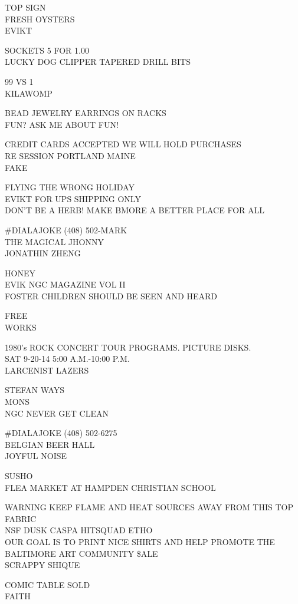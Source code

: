\documentclass[10pt,letterpaper]{article}
\begin{document}
TOP SIGN\\
FRESH OYSTERS\\
EVIKT

SOCKETS 5 FOR 1.00\\
LUCKY DOG CLIPPER TAPERED DRILL BITS

99 VS 1\\
KILAWOMP

BEAD JEWELRY EARRINGS ON RACKS\\
FUN?  ASK ME ABOUT FUN!

CREDIT CARDS ACCEPTED WE WILL HOLD PURCHASES\\
RE SESSION PORTLAND MAINE\\
FAKE

FLYING THE WRONG HOLIDAY\\
EVIKT FOR UPS SHIPPING ONLY\\
DON'T BE A HERB!  MAKE BMORE A BETTER PLACE FOR ALL

\#DIALAJOKE (408) 502{-}MARK\\
THE MAGICAL JHONNY\\
JONATHIN ZHENG

HONEY\\
EVIK NGC MAGAZINE VOL II\\
FOSTER CHILDREN SHOULD BE SEEN AND HEARD

FREE\\
WORKS

1980's ROCK CONCERT TOUR PROGRAMS.  PICTURE DISKS.\\
SAT 9{-}20{-}14 5:00 A.M.{-}10:00 P.M.\\
LARCENIST LAZERS

STEFAN WAYS\\
MONS\\
NGC NEVER GET CLEAN

\#DIALAJOKE (408) 502{-}6275\\
BELGIAN BEER HALL\\
JOYFUL NOISE

SUSHO\\
FLEA MARKET AT HAMPDEN CHRISTIAN SCHOOL

WARNING KEEP FLAME AND HEAT SOURCES AWAY FROM THIS TOP FABRIC\\
NSF DUSK CASPA HITSQUAD ETHO\\
OUR GOAL IS TO PRINT NICE SHIRTS AND HELP PROMOTE THE BALTIMORE ART COMMUNITY \$ALE\\
SCRAPPY SHIQUE

COMIC TABLE SOLD\\
FAITH
\end{document}
